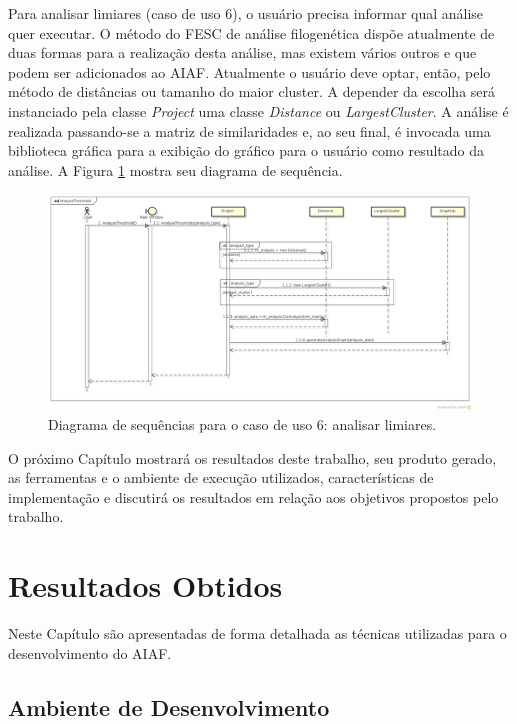 Para analisar limiares (caso de uso 6),
o usuário precisa informar qual análise quer executar. O método do FESC de análise filogenética dispõe atualmente de duas formas
para a realização desta análise, mas existem vários outros e que podem ser adicionados ao AIAF. Atualmente o usuário deve optar, então, pelo método de
distâncias ou tamanho do maior cluster. A depender da escolha será instanciado pela classe \textit{Project} uma classe \textit{Distance} ou
\textit{LargestCluster}. A análise é realizada passando-se a matriz de similaridades e, ao seu final, é invocada uma biblioteca gráfica
para a exibição do gráfico para o usuário como resultado da análise. A Figura \ref{fig:analyse-threshold} mostra seu diagrama de sequência.

\begin{figure}
\centering
\includegraphics[scale=0.34]{analyse-threshold}
\caption{Diagrama de sequências para o caso de uso 6: analisar limiares.}
\label{fig:analyse-threshold}
\end{figure}

O próximo Capítulo mostrará os resultados deste trabalho, seu produto gerado, as ferramentas e o ambiente de execução utilizados, características
de implementação e discutirá os resultados em relação aos objetivos propostos pelo trabalho.

\chapter{Resultados Obtidos}
\label{cap:resultados}

Neste Capítulo são apresentadas de forma detalhada as técnicas utilizadas para o desenvolvimento do AIAF.


\section{Ambiente de Desenvolvimento} \label{sec:ambiente}

